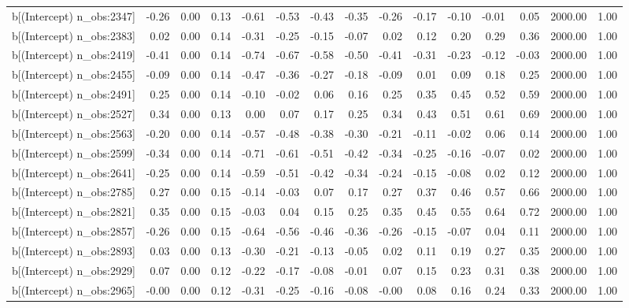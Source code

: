 \begin{table}[ht]
\begin{tabular}{rrrrrrrrrrrrrrr}
  b[(Intercept) n\_obs:2347] & -0.26 & 0.00 & 0.13 & -0.61 & -0.53 & -0.43 & -0.35 & -0.26 & -0.17 & -0.10 & -0.01 & 0.05 & 2000.00 & 1.00 \\ 
  b[(Intercept) n\_obs:2383] & 0.02 & 0.00 & 0.14 & -0.31 & -0.25 & -0.15 & -0.07 & 0.02 & 0.12 & 0.20 & 0.29 & 0.36 & 2000.00 & 1.00 \\ 
  b[(Intercept) n\_obs:2419] & -0.41 & 0.00 & 0.14 & -0.74 & -0.67 & -0.58 & -0.50 & -0.41 & -0.31 & -0.23 & -0.12 & -0.03 & 2000.00 & 1.00 \\ 
  b[(Intercept) n\_obs:2455] & -0.09 & 0.00 & 0.14 & -0.47 & -0.36 & -0.27 & -0.18 & -0.09 & 0.01 & 0.09 & 0.18 & 0.25 & 2000.00 & 1.00 \\ 
  b[(Intercept) n\_obs:2491] & 0.25 & 0.00 & 0.14 & -0.10 & -0.02 & 0.06 & 0.16 & 0.25 & 0.35 & 0.45 & 0.52 & 0.59 & 2000.00 & 1.00 \\ 
  b[(Intercept) n\_obs:2527] & 0.34 & 0.00 & 0.13 & 0.00 & 0.07 & 0.17 & 0.25 & 0.34 & 0.43 & 0.51 & 0.61 & 0.69 & 2000.00 & 1.00 \\ 
  b[(Intercept) n\_obs:2563] & -0.20 & 0.00 & 0.14 & -0.57 & -0.48 & -0.38 & -0.30 & -0.21 & -0.11 & -0.02 & 0.06 & 0.14 & 2000.00 & 1.00 \\ 
  b[(Intercept) n\_obs:2599] & -0.34 & 0.00 & 0.14 & -0.71 & -0.61 & -0.51 & -0.42 & -0.34 & -0.25 & -0.16 & -0.07 & 0.02 & 2000.00 & 1.00 \\ 
  b[(Intercept) n\_obs:2641] & -0.25 & 0.00 & 0.14 & -0.59 & -0.51 & -0.42 & -0.34 & -0.24 & -0.15 & -0.08 & 0.02 & 0.12 & 2000.00 & 1.00 \\ 
  b[(Intercept) n\_obs:2785] & 0.27 & 0.00 & 0.15 & -0.14 & -0.03 & 0.07 & 0.17 & 0.27 & 0.37 & 0.46 & 0.57 & 0.66 & 2000.00 & 1.00 \\ 
  b[(Intercept) n\_obs:2821] & 0.35 & 0.00 & 0.15 & -0.03 & 0.04 & 0.15 & 0.25 & 0.35 & 0.45 & 0.55 & 0.64 & 0.72 & 2000.00 & 1.00 \\ 
  b[(Intercept) n\_obs:2857] & -0.26 & 0.00 & 0.15 & -0.64 & -0.56 & -0.46 & -0.36 & -0.26 & -0.15 & -0.07 & 0.04 & 0.11 & 2000.00 & 1.00 \\ 
  b[(Intercept) n\_obs:2893] & 0.03 & 0.00 & 0.13 & -0.30 & -0.21 & -0.13 & -0.05 & 0.02 & 0.11 & 0.19 & 0.27 & 0.35 & 2000.00 & 1.00 \\ 
  b[(Intercept) n\_obs:2929] & 0.07 & 0.00 & 0.12 & -0.22 & -0.17 & -0.08 & -0.01 & 0.07 & 0.15 & 0.23 & 0.31 & 0.38 & 2000.00 & 1.00 \\ 
  b[(Intercept) n\_obs:2965] & -0.00 & 0.00 & 0.12 & -0.31 & -0.25 & -0.16 & -0.08 & -0.00 & 0.08 & 0.16 & 0.24 & 0.33 & 2000.00 & 1.00 \\ 

\end{tabular}
\end{table}
